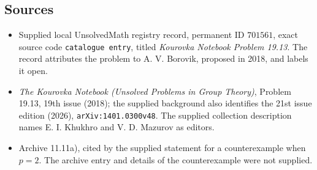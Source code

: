 \documentclass[11pt]{article}
\begin{document}
\subsection{Sources}
\begin{itemize}
\item Supplied local UnsolvedMath registry record, permanent ID \(701561\), exact source code \texttt{catalogue entry}, titled \emph{Kourovka Notebook Problem 19.13}. The record attributes the problem to A. V. Borovik, proposed in 2018, and labels it open.
\item \emph{The Kourovka Notebook (Unsolved Problems in Group Theory)}, Problem 19.13, 19th issue (2018); the supplied background also identifies the 21st issue edition (2026), \texttt{arXiv:1401.0300v48}. The supplied collection description names E. I. Khukhro and V. D. Mazurov as editors.
\item Archive 11.11a), cited by the supplied statement for a counterexample when \(p=2\). The archive entry and details of the counterexample were not supplied.
\end{itemize}
\end{document}
